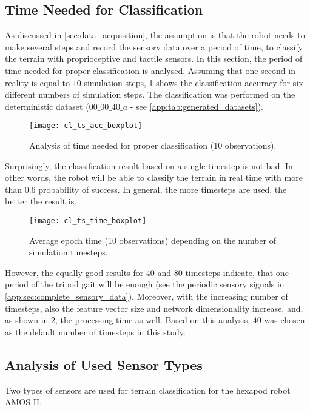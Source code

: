 \subsection{Time Needed for Classification} \label{ssec:number_of_timesteps}
As discussed in \cref{sec:data_acquisition}, the assumption is that the robot needs to make several steps and record the sensory data over a period of time, to classify the terrain with proprioceptive and tactile sensors. In this section, the period of time needed for proper classification is analysed. Assuming that one second in reality is equal to $ 10 $ simulation steps, \cref{fig:ts_acc_boxplot} shows the classification accuracy for six different numbers of simulation steps. The classification was performed on the deterministic dataset ($ 00\_00\_40\_a $ - see \cref{app:tab:generated_datasets}).

\begin{figure}[H]
  \centering
  \texttt{[image: cl\_ts\_acc\_boxplot]}
  \caption{Analysis of time needed for proper classification (10 observations).}
  \label{fig:ts_acc_boxplot}
\end{figure}

Surprisingly, the classification result based on a single timestep is not bad. In other words, the robot will be able to classify the terrain in real time with more than $ 0.6 $ probability of success. In general, the more timesteps are used, the better the result is.

\begin{figure}[H]
  \centering
  \texttt{[image: cl\_ts\_time\_boxplot]}
  \caption{Average epoch time (10 observations) depending on the number of simulation timesteps.}
  \label{fig:ts_time_boxplot}
\end{figure}

However, the equally good results for $ 40 $ and $ 80 $ timesteps indicate, that one period of the tripod gait will be enough (see the periodic sensory signals in \cref{app:sec:complete_sensory_data}). Moreover, with the increasing number of timesteps, also the feature vector size and network dimensionality increase, and, as shown in \cref{fig:ts_time_boxplot}, the processing time as well. Based on this analysis, $ 40 $ was chosen as the default number of timesteps in this study. 

\subsection{Analysis of Used Sensor Types} \label{ssec:analysis_of_used_sensor_types}
Two types of sensors are used for terrain classification for the hexapod robot AMOS II:


